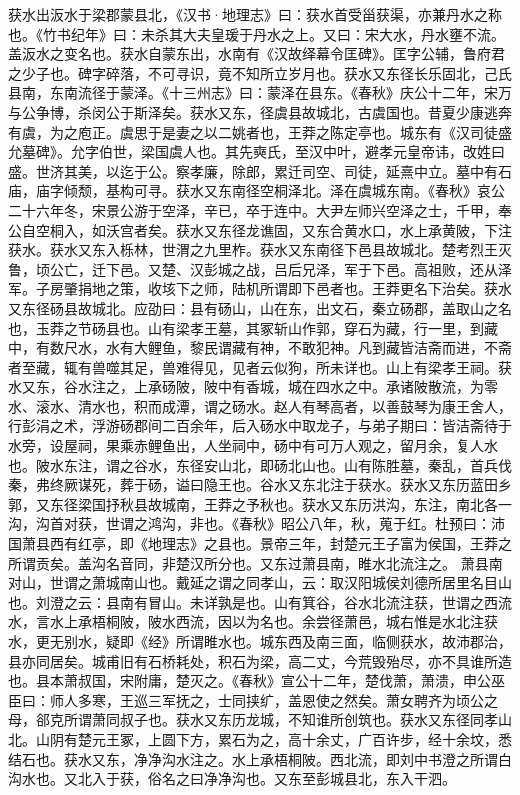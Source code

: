 \documentclass[12pt,UTF8]{ctexbook}
\begin{document}
获水出汳水于梁郡蒙县北，《汉书·地理志》曰：获水首受甾获渠，亦兼丹水之称也。《竹书纪年》曰：未杀其大夫皇瑗于丹水之上。又曰：宋大水，丹水壅不流。盖汳水之变名也。获水自蒙东出，水南有《汉故绎幕令匡碑》。匡字公辅，鲁府君之少子也。碑字碎落，不可寻识，竟不知所立岁月也。获水又东径长乐固北，己氏县南，东南流径于蒙泽。《十三州志》曰：蒙泽在县东。《春秋》庆公十二年，宋万与公争博，杀闵公于斯泽矣。获水又东，径虞县故城北，古虞国也。昔夏少康逃奔有虞，为之庖正。虞思于是妻之以二姚者也，王莽之陈定亭也。城东有《汉司徒盛允墓碑》。允字伯世，梁国虞人也。其先奭氏，至汉中叶，避孝元皇帝讳，改姓曰盛。世济其美，以迄于公。察孝廉，除郎，累迁司空、司徒，延熹中立。墓中有石庙，庙字倾颓，基构可寻。获水又东南径空桐泽北。泽在虞城东南。《春秋》哀公二十六年冬，宋景公游于空泽，辛已，卒于连中。大尹左师兴空泽之士，千甲，奉公自空桐入，如沃宫者矣。获水又东径龙谯固，又东合黄水口，水上承黄陂，下注获水。获水又东入栎林，世渭之九里柞。获水又东南径下邑县故城北。楚考烈王灭鲁，顷公亡，迁下邑。又楚、汉彭城之战，吕后兄泽，军于下邑。高祖败，还从泽军。子房肇捐地之策，收垓下之师，陆机所谓即下邑者也。王莽更名下治矣。获水又东径砀县故城北。应劭曰：县有砀山，山在东，出文石，秦立砀郡，盖取山之名也，玉莽之节砀县也。山有梁孝王墓，其冢斩山作郭，穿石为藏，行一里，到藏中，有数尺水，水有大鲤鱼，黎民谓藏有神，不敢犯神。凡到藏皆洁斋而进，不斋者至藏，辄有兽噬其足，兽难得见，见者云似狗，所未详也。山上有梁孝王祠。获水又东，谷水注之，上承砀陂，陂中有香城，城在四水之中。承诸陂散流，为零水、滚水、清水也，积而成潭，谓之砀水。赵人有琴高者，以善鼓琴为康王舍人，行彭涓之术，浮游砀郡间二百余年，后入砀水中取龙子，与弟子期曰：皆洁斋待于水旁，设屋祠，果乘赤鲤鱼出，人坐祠中，砀中有可万人观之，留月余，复人水也。陂水东注，谓之谷水，东径安山北，即砀北山也。山有陈胜墓，秦乱，首兵伐秦，弗终厥谋死，葬于砀，谥曰隐王也。谷水又东北注于获水。获水又东历蓝田乡郭，又东径梁国抒秋县故城南，王莽之予秋也。获水又东历洪沟，东注，南北各一沟，沟首对获，世谓之鸿沟，非也。《春秋》昭公八年，秋，蒐于红。杜预曰：沛国萧县西有红亭，即《地理志》之县也。景帝三年，封楚元王子富为侯国，王莽之所谓贡矣。盖沟名音同，非楚汉所分也。又东过萧县南，睢水北流注之。
萧县南对山，世谓之萧城南山也。戴延之谓之同孝山，云：取汉阳城侯刘德所居里名目山也。刘澄之云：县南有冒山。未详孰是也。山有箕谷，谷水北流注获，世谓之西流水，言水上承梧桐陂，陂水西流，因以为名也。余尝径萧邑，城右惟是水北注获水，更无别水，疑即《经》所谓睢水也。城东西及南三面，临侧获水，故沛郡治，县亦同居矣。城甫旧有石桥耗处，积石为梁，高二丈，今荒毁殆尽，亦不具谁所造也。县本萧叔国，宋附庸，楚灭之。《春秋》宣公十二年，楚伐萧，萧溃，申公巫臣曰：师人多寒，王巡三军抚之，士同挟纩，盖恩使之然矣。萧女聘齐为顷公之母，郤克所谓萧同叔子也。获水又东历龙城，不知谁所创筑也。获水又东径同孝山北。山阴有楚元王冢，上圆下方，累石为之，高十余丈，广百许步，经十余坟，悉结石也。获水又东，净净沟水注之。水上承梧桐陂。西北流，即刘中书澄之所谓白沟水也。又北入于获，俗名之曰净净沟也。又东至彭城县北，东入干泗。
\end{document}
